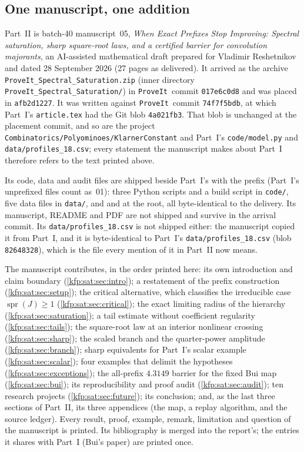 \documentclass[11pt,a4paper]{article}
\theoremstyle{definition}
\theoremstyle{remark}
\newcommand{\spr}{\operatorname{spr}}
\newcommand{\repo}{\texttt{ProveIt}}
\begin{document}
\subsection{One manuscript, one addition}
Part~II is batch-40 manuscript~05, \emph{When Exact Prefixes Stop
Improving: Spectral saturation, sharp square-root laws, and a certified
barrier for convolution majorants}, an AI-assisted mathematical draft
prepared for Vladimir Reshetnikov and dated 28 September 2026 (27 pages as
delivered). It arrived as the archive
\texttt{ProveIt\_Spectral\_Saturation.zip} (inner directory
\texttt{ProveIt\_Spectral\_Saturation/}) in \repo\ commit
\texttt{017e6c0d8} and was placed in \texttt{afb2d1227}. It was written
against \repo\ commit \texttt{74f7f5bdb}, at which Part~I's
\texttt{article.tex} had the Git blob \texttt{4a021fb3}. That blob is
unchanged at the placement commit, and so are the project
\texttt{Combinatorics/Polyominoes/KlarnerConstant} and Part~I's
\texttt{code/model.py} and \texttt{data/profiles\_18.csv}; every statement
the manuscript makes about Part~I therefore refers to the text printed above.

Its code, data and audit files are shipped beside Part~I's with the prefix
 (Part~I's unprefixed files count as~01):
three Python scripts and a build script in \texttt{code/}, five data files
in \texttt{data/}, and
 and
 at the root, all byte-identical to
the delivery. Its manuscript, README and PDF are not shipped and survive in
the arrival commit. Its \texttt{data/profiles\_18.csv} is not shipped
either: the manuscript copied it from Part~I, and it is byte-identical to
Part~I's \texttt{data/profiles\_18.csv} (blob \texttt{82648328}), which is
the file every mention of it in Part~II now means.

The manuscript contributes, in the order printed here: its own
introduction and claim boundary (\cref{kfp:sat:sec:intro}); a restatement
of the prefix construction (\cref{kfp:sat:sec:setup}); the critical
alternative, which classifies the irreducible case $\spr(J)\ge1$
(\cref{kfp:sat:sec:critical}); the exact limiting radius of the hierarchy
(\cref{kfp:sat:sec:saturation}); a tail estimate without coefficient
regularity (\cref{kfp:sat:sec:tails}); the square-root law at an interior
nonlinear crossing (\cref{kfp:sat:sec:sharp}); the scaled branch and the
quarter-power amplitude (\cref{kfp:sat:sec:branch}); sharp equivalents for
Part~I's scalar example (\cref{kfp:sat:sec:scalar}); four examples that
delimit the hypotheses (\cref{kfp:sat:sec:exceptions}); the all-prefix
$4.3149$ barrier for the fixed Bui map (\cref{kfp:sat:sec:bui}); its
reproducibility and proof audit (\cref{kfp:sat:sec:audit}); ten research
projects (\cref{kfp:sat:sec:future}); its conclusion; and, as the last three
sections of Part~II, its three appendices (the map, a replay algorithm, and
the source ledger). Every result, proof, example, remark, limitation and
question of the manuscript is printed. Its bibliography is merged into the
report's; the entries it shares with Part~I (Bui's paper) are printed once.
\end{document}
